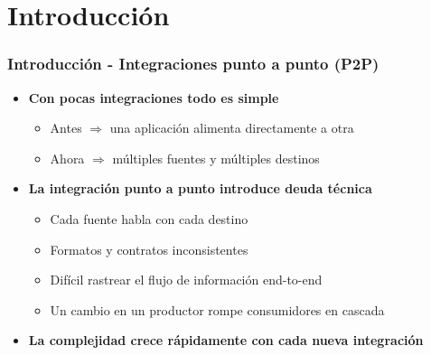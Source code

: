 \documentclass[aspectratio=169]{beamer}
\begin{document}
\section{Introducción}

\begin{frame}\frametitle{Introducción - Integraciones punto a punto (P2P)}
	\begin{itemize}
		\item \textbf{Con pocas integraciones todo es simple}
		\begin{itemize}
			\item Antes $\Rightarrow$ una aplicación alimenta directamente a otra
			\item Ahora $\Rightarrow$ múltiples fuentes y múltiples destinos
		\end{itemize}

		\vspace{1em}

		\item \textbf{La integración punto a punto introduce deuda técnica}
		\begin{itemize}
      \item Cada fuente habla con cada destino
			\item Formatos y contratos inconsistentes
			\item Difícil rastrear el flujo de información end-to-end
			\item Un cambio en un productor rompe consumidores en cascada
		\end{itemize}

    \vspace{1em}
  
    \item \textbf{La complejidad crece rápidamente con cada nueva integración}
	\end{itemize}
\end{frame}
\end{document}
